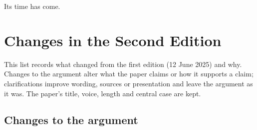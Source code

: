 \documentclass[11pt,a4paper]{article}
\begin{document}
Its time has come.

\section*{Changes in the Second Edition}

This list records what changed from the first edition (12 June 2025) and why. Changes to the argument alter what the paper claims or how it supports a claim; clarifications improve wording, sources or presentation and leave the argument as it was. The paper's title, voice, length and central case are kept.

\subsection*{Changes to the argument}
\end{document}
